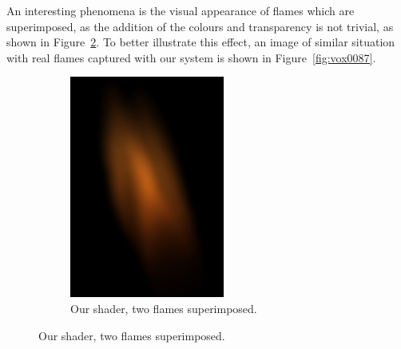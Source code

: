 An interesting phenomena is the visual appearance of flames which are superimposed, as the addition of the colours and transparency is not trivial, as shown in Figure~\ref{fig:result_synthetic}.
To better illustrate this effect, an image of similar situation  with real flames captured with our system is shown in Figure~\ref{fig:vox0087}.

\begin{figure}[ht!]
        \centering
        \begin{subfigure}[t]{0.2\textwidth}
                \includegraphics[width=\textwidth]{img/result_synthetic}
                \caption{Our shader, two flames superimposed.}
                \label{fig:result_synthetic}
        \end{subfigure}%
        \qquad %

\end{figure}
